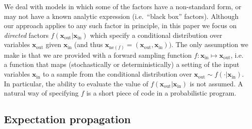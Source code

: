 \documentclass[english]{article}
\theoremstyle{plain}
\theoremstyle{plain}
\newcommand{\bx}{\mathbf{x}}				%
\newcommand{\factor}{f}				%
\newcommand{\fis}[1]{\mathrm{ne}(#1)}   	%
\newcommand{\fx}[1]{ \mathbf{x}_{\mathrm{ne}(#1)} }   	%
\newcommand{\xin}{\mathbf{x}_{ \mathrm{in} }} 			%
\newcommand{\xout}{\mathbf{x}_{ \mathrm{out} }}			%
\newcommand{\msg}[2]{m_{#1 \rightarrow #2}}			%
\newcommand{\diffd}{\mathrm{d}}
\begin{document}
We deal with models in which some of the factors have a non-standard form, or may not have a known analytic expression (i.e.\ ``black box'' factors). Although our approach applies to any such factor in principle, in this paper we focus on \textit{directed} factors $\factor(\xout | \xin)$ which specify a conditional distribution over variables $\xout$ given $\xin$ (and thus $\fx{\factor} = (\xout, \xin))$. The only assumption we make is that we are provided with a forward sampling function $f: \xin \mapsto \xout$, i.e. a function that maps (stochastically or deterministically) a setting of the input variables $\xin$ to a sample from the conditional distribution over $\xout \sim \factor(\cdot| \xin)$.
In particular, the ability to evaluate the value of $\factor(\xout | \xin)$ is not assumed.
A natural way of specifying $f$ is a short piece of code in a probabilistic program.



\subsection{Expectation propagation}
\label{sec:EP:MP}

\end{document}
